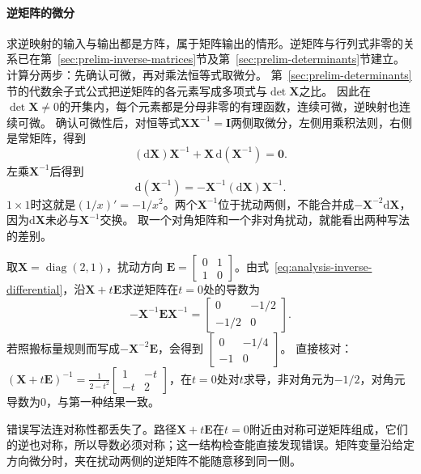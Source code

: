 \paragraph{逆矩阵的微分}
求逆映射的输入与输出都是方阵，属于矩阵输出的情形。逆矩阵与行列式非零的关系已在第~\ref{sec:prelim-inverse-matrices}节及第~\ref{sec:prelim-determinants}节建立。
计算分两步：先确认可微，再对乘法恒等式取微分。
第~\ref{sec:prelim-determinants}节的代数余子式公式把逆矩阵的各元素写成多项式与$\det\bm X$之比。
因此在$\det\bm X\neq0$的开集内，每个元素都是分母非零的有理函数，连续可微，逆映射也连续可微。
确认可微性后，对恒等式$\bm{X}\bm{X}^{-1}=\bm{I}$两侧取微分，左侧用乘积法则，右侧是常矩阵，得到
\[
 (\mathrm{d}\bm{X})\bm{X}^{-1}+\bm{X}\,\mathrm{d}(\bm{X}^{-1})=\bm{0}.
\]
左乘$\bm{X}^{-1}$后得到
\begin{equation}
  \mathrm{d}(\bm{X}^{-1})
  =
  -\bm{X}^{-1}(\mathrm{d}\bm{X})\bm{X}^{-1}.
\label{eq:analysis-inverse-differential}
\end{equation}
$1\times1$时这就是$(1/x)'=-1/x^2$。两个$\bm{X}^{-1}$位于扰动两侧，不能合并成$-\bm{X}^{-2}\mathrm{d}\bm{X}$，因为$\mathrm{d}\bm{X}$未必与$\bm{X}^{-1}$交换。
取一个对角矩阵和一个非对角扰动，就能看出两种写法的差别。
\begin{example}[逆矩阵微分中的乘法次序]
\label{ex:analysis-noncommuting-inverse-differential}
取$\bm X=\operatorname{diag}(2,1)$，扰动方向
$\bm E=\begin{bmatrix}0&1\\1&0\end{bmatrix}$。由式~\eqref{eq:analysis-inverse-differential}，沿$\bm X+t\bm E$求逆矩阵在$t=0$处的导数为
\[
 -\bm X^{-1}\bm E\bm X^{-1}
 =\begin{bmatrix}0&-1/2\\-1/2&0\end{bmatrix}.
\]
若照搬标量规则而写成$-\bm X^{-2}\bm E$，会得到
$\begin{bmatrix}0&-1/4\\-1&0\end{bmatrix}$。
直接核对：$(\bm X+t\bm E)^{-1}=\frac1{2-t^2}\begin{bmatrix}1&-t\\-t&2\end{bmatrix}$，在$t=0$处对$t$求导，非对角元为$-1/2$，对角元导数为$0$，与第一种结果一致。
\end{example}

错误写法连对称性都丢失了。路径$\bm X+t\bm E$在$t=0$附近由对称可逆矩阵组成，它们的逆也对称，所以导数必须对称；这一结构检查能直接发现错误。矩阵变量沿给定方向微分时，夹在扰动两侧的逆矩阵不能随意移到同一侧。

